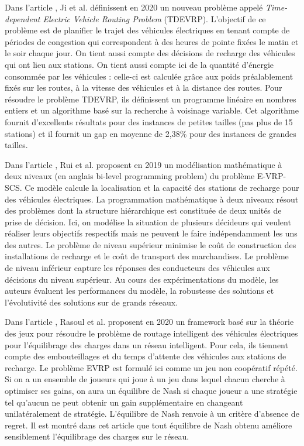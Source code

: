 Dans l'article \cite{EVRP_Ji_2020}, Ji et al. définissent en 2020 un nouveau problème appelé \textit{Time-dependent Electric Vehicle Routing Problem} (TDEVRP). L'objectif de ce problème est de planifier le trajet des véhicules électriques en tenant compte de périodes de congestion qui correspondent à des heures de pointe fixées le matin et le soir chaque jour. On tient aussi compte des décisions de recharge des véhicules qui ont lieu aux stations. On tient aussi compte ici de la quantité d'énergie consommée par les véhicules : celle-ci est calculée grâce aux poids préalablement fixés sur les routes, à la vitesse des véhicules et à la distance des routes. Pour résoudre le problème TDEVRP, ils définissent un programme linéaire en nombres entiers et un algorithme basé sur la recherche à voisinage variable. Cet algorithme fournit d'excellents résultats pour des instances de petites tailles (pas plus de 15 stations) et il fournit un gap en moyenne de 2,38\% pour des instances de grandes tailles. 

Dans l'article \cite{EVRP_Rui_2020}, Rui et al. proposent en 2019  un modélisation mathématique à deux niveaux (en anglais bi-level programming problem) du problème E-VRP-SCS. Ce modèle calcule la localisation et la capacité des stations de recharge pour des véhicules électriques. La programmation mathématique à deux niveaux résout des problèmes dont la structure hiérarchique est constituée de deux unités de prise de décision. Ici, on modélise la situation de plusieurs décideurs qui veulent réaliser leurs objectifs respectifs mais ne peuvent le faire indépendamment les uns des autres. Le problème de niveau supérieur minimise le coût de construction des installations de recharge et le coût de transport des marchandises. Le problème de niveau inférieur capture les réponses des conducteurs des véhicules aux décisions du niveau supérieur. Au cours des expérimentations du modèle, les auteurs évaluent les performances du modèle, la robustesse des solutions et l'évolutivité des solutions sur de grands réseaux.  


Dans l'article \cite{EVRP_Rasoul_2020}, Rasoul et al. proposent en 2020 un framework basé sur la théorie des jeux pour résoudre le problème de routage intelligent des véhicules électriques pour l'équilibrage des charges dans un réseau intelligent. Pour cela, ils tiennent compte des embouteillages et du temps d'attente des véhicules aux stations de recharge. Le problème EVRP est formulé ici comme un jeu non coopératif répété.  Si on a un ensemble de joueurs qui joue à un jeu dans lequel chacun cherche à optimiser ses gains, on aura un équilibre de Nash si chaque joueur a une stratégie tel qu'aucun ne peut obtenir un gain supplémentaire en changeant unilatéralement de stratégie. L'équilibre de Nash renvoie à un critère d'absence de regret. Il est montré dans cet article que tout équilibre de Nash obtenu améliore sensiblement l'équilibrage des charges sur le réseau.

